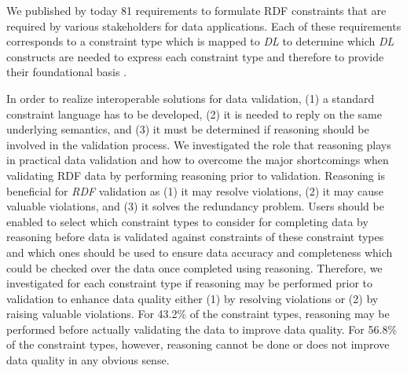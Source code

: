 \documentclass{acm_proc_article-sp}
\begin{document}
We published by today 81 requirements to formulate RDF constraints that are required by various stakeholders for data applications.
Each of these requirements corresponds to a constraint type which is mapped to \emph{DL}
to determine which \emph{DL} constructs are needed to express each constraint type
and therefore to provide their foundational basis \cite{BoschNolleAcarEckert2015}.

In order to realize interoperable solutions for data validation,
(1) a standard constraint language has to be developed, 
(2) it is needed to reply on the same underlying semantics, and 
(3) it must be determined if reasoning should be involved in the validation process.
We investigated the role that reasoning plays in practical data validation and 
how to overcome the major shortcomings when validating RDF data by performing reasoning prior to validation.
Reasoning is beneficial for \emph{RDF} validation as 
(1) it may resolve violations, 
(2) it may cause valuable violations, and 
(3) it solves the redundancy problem.
Users should be enabled to select which constraint types to consider for completing data by reasoning before data is validated against constraints of these constraint types 
and which ones should be used to ensure data accuracy and completeness which could be checked over the data once completed using reasoning.
Therefore, we investigated for each constraint type if reasoning may be performed prior to validation to enhance data quality
either (1) by resolving violations or (2) by raising valuable violations.
For 43.2\% of the constraint types, reasoning may be performed before actually validating the data to improve data quality.
For 56.8\% of the constraint types, however, reasoning cannot be done or does not improve data quality in any obvious sense.
\end{document}
